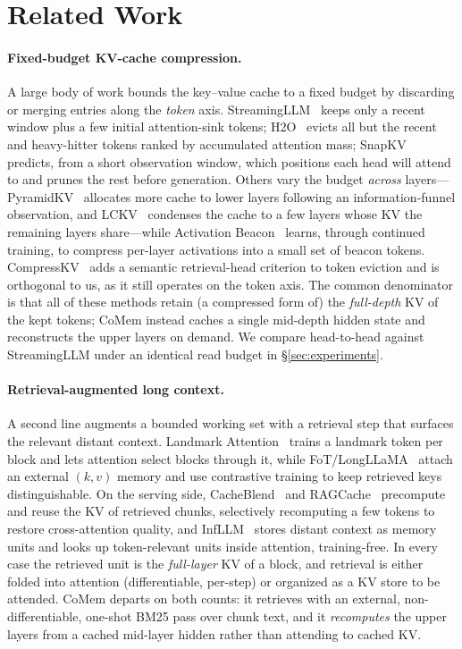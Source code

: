 \section{Related Work}
\label{sec:related}

\paragraph{Fixed-budget KV-cache compression.} A large body of work bounds the
key--value cache to a fixed budget by discarding or merging entries along the
\emph{token} axis. StreamingLLM~\citep{streamingllm} keeps only a recent window
plus a few initial attention-sink tokens; H2O~\citep{h2o} evicts all but the
recent and heavy-hitter tokens ranked by accumulated attention mass;
SnapKV~\citep{snapkv} predicts, from a short observation window, which positions
each head will attend to and prunes the rest before generation. Others vary the
budget \emph{across} layers---PyramidKV~\citep{pyramidkv} allocates more cache to
lower layers following an information-funnel observation, and
LCKV~\citep{lckv} condenses the cache to a few layers whose KV the remaining
layers share---while Activation Beacon~\citep{actbeacon} learns, through
continued training, to compress per-layer activations into a small set of beacon
tokens. CompressKV~\citep{compresskv} adds a semantic retrieval-head criterion to
token eviction and is orthogonal to us, as it still operates on the token axis.
The common denominator is that all of these methods retain (a compressed form of)
the \emph{full-depth} KV of the kept tokens; CoMem instead caches a single
mid-depth hidden state and reconstructs the upper layers on demand. We compare
head-to-head against StreamingLLM under an identical read budget in
\S\ref{sec:experiments}.

\paragraph{Retrieval-augmented long context.} A second line augments a bounded
working set with a retrieval step that surfaces the relevant distant context.
Landmark Attention~\citep{landmark} trains a landmark token per block and lets
attention select blocks through it, while FoT/LongLLaMA~\citep{longllama} attach
an external $(k,v)$ memory and use contrastive training to keep retrieved keys
distinguishable. On the serving side, CacheBlend~\citep{cacheblend} and
RAGCache~\citep{ragcache} precompute and reuse the KV of retrieved chunks,
selectively recomputing a few tokens to restore cross-attention quality, and
InfLLM~\citep{infllm} stores distant context as memory units and looks up
token-relevant units inside attention, training-free. In every case the
retrieved unit is the \emph{full-layer} KV of a block, and retrieval is either
folded into attention (differentiable, per-step) or organized as a KV store to
be attended. CoMem departs on both counts: it retrieves with an external,
non-differentiable, one-shot BM25 pass over chunk text, and it \emph{recomputes}
the upper layers from a cached mid-layer hidden rather than attending to cached
KV.

